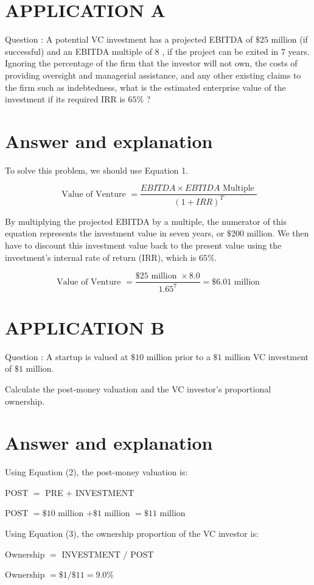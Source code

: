 \documentclass[11pt]{article}
\begin{document}
\section*{APPLICATION A}
Question : A potential VC investment has a projected EBITDA of $\$ 25$ million (if successful) and an EBITDA multiple of 8 , if the project can be exited in 7 years. Ignoring the percentage of the firm that the investor will not own, the costs of providing oversight and managerial assistance, and any other existing claims to the firm such as indebtedness, what is the estimated enterprise value of the investment if its required IRR is $65 \%$ ?

\section*{Answer and explanation}
To solve this problem, we should use Equation 1.

$$
\text { Value of Venture }=\frac{E B I T D A \times E B T I D A \text { Multiple }}{(1+I R R)^{T}}
$$

By multiplying the projected EBITDA by a multiple, the numerator of this equation represents the investment value in seven years, or $\$ 200$ million. We then have to discount this investment value back to the present value using the investment's internal rate of return (IRR), which is $65 \%$.

$$
\text { Value of Venture }=\frac{\$ 25 \text { million } \times 8.0}{1.65^{7}}=\$ 6.01 \text { million }
$$

\section*{APPLICATION B}
Question : A startup is valued at $\$ 10$ million prior to a $\$ 1$ million VC investment of $\$ 1$ million.

Calculate the post-money valuation and the VC investor's proportional ownership.

\section*{Answer and explanation}
Using Equation (2), the post-money valuation is:

POST $=$ PRE + INVESTMENT

POST $=\$ 10$ million $+\$ 1$ million $=\$ 11$ million

Using Equation (3), the ownership proportion of the VC investor is:

Ownership $=$ INVESTMENT $/$ POST

Ownership $=\$ 1 / \$ 11=9.0 \%$
\end{document}
